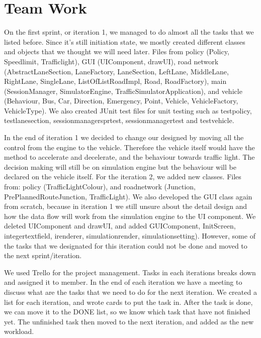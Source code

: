 \documentclass[11pt]{article}
\begin{document}
\section{Team Work}
On the first sprint, or iteration 1, we managed to do almost all the tasks that we listed before. Since it's still initiation state, we mostly created different classes and objects that we thought we will need later. Files from policy (Policy, Speedlimit, Trafficlight), GUI (UIComponent, drawUI), road network (AbstractLaneSection, LaneFactory, LaneSection, LeftLane, MiddleLane, RightLane, SingleLane, ListOfListRoadImpl, Road, RoadFactory), main (SessionManager, SimulatorEngine, TrafficSimulatorApplication), and vehicle (Behaviour, Bus, Car, Direction, Emergency, Point, Vehicle, VehicleFactory, VehicleType). We also created JUnit test files for unit testing such as testpolicy, testlanesection, sessionmanagersprtest, sessionmanagertest and testvehicle. 

In the end of iteration 1 we decided to change our designed by moving all the control from the engine to the vehicle. Therefore the vehicle itself would have the method to accelerate and decelerate, and the behaviour towards traffic light. The decision making will still be on simulation engine but the behaviour will be declared on the vehicle itself. 
For the iteration 2, we added new classes. Files from: policy (TrafficLightColour), and roadnetwork (Junction, PrePlannedRouteJunction, TrafficLight). We also developed the GUI class again from scratch, because in iteration 1 we still unsure about the detail design and how the data flow will work from the simulation engine to the UI component. We deleted UIComponent and drawUI, and added GUIComponent, InitScreen, integertextfield, irenderer, simulationrender, simulationsetting). However, some of the tasks that we designated for this iteration could not be done and moved to the next sprint/iteration.  

We used Trello for the project management. Tasks in each iterations breaks down and assigned it to member. In the end of each iteration we have a meeting to discuss what are the tasks that we need to do for the next iteration. We created a list for each iteration, and wrote cards to put the task in. After the task is done, we can move it to the DONE list, so we know which task that have not finished yet. The unfinished task then moved to the next iteration, and added as the new workload.
\end{document}
